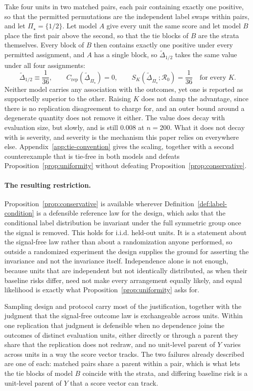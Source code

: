 \documentclass[11pt]{article}
\newcommand{\Regime}{\mathcal{R}}
\newcommand{\PSet}{\Pi_\star}
\newcommand{\Dta}{\widetilde{\Delta}}
\newcommand{\RobDta}{\underline{\widetilde{\Delta}}_{\PSet}}
\theoremstyle{remark}
\begin{document}
Take four units in two matched pairs, each pair containing exactly one positive, so that the permitted permutations are the independent label swaps within pairs, and let $\PSet=\{1/2\}$. Let model $A$ give every unit the same score and let model $B$ place the first pair above the second, so that the tie blocks of $B$ are the strata themselves. Every block of $B$ then contains exactly one positive under every permitted assignment, and $A$ has a single block, so $\Dta_{1/2}$ takes the same value under all four assignments:
\[
\Dta_{1/2}\equiv\frac{1}{36},
\qquad
C_{\mathrm{rep}}(\RobDta)=0,
\qquad
S_K(\RobDta;\Regime_0)=\frac{1}{36}
\quad\text{for every }K .
\]
Neither model carries any association with the outcomes, yet one is reported as supportedly superior to the other. Raising $K$ does not damp the advantage, since there is no replication disagreement to charge for, and an outer bound around a degenerate quantity does not remove it either. The value does decay with evaluation size, but slowly, and is still $0.008$ at $n=200$. What it does not decay with is severity, and severity is the mechanism this paper relies on everywhere else. Appendix~\ref{app:tie-convention} gives the scaling, together with a second counterexample that is tie-free in both models and defeats Proposition~\ref{prop:uniformity} without defeating Proposition~\ref{prop:conservative}.

\paragraph{The resulting restriction.}
Proposition~\ref{prop:conservative} is available wherever Definition~\ref{def:label-condition} is a defensible reference law for the design, which asks that the conditional label distribution be invariant under the full symmetric group once the signal is removed. This holds for i.i.d. held-out units. It is a statement about the signal-free law rather than about a randomization anyone performed, so outside a randomized experiment the design supplies the ground for asserting the invariance and not the invariance itself. Independence alone is not enough, because units that are independent but not identically distributed, as when their baseline risks differ, need not make every arrangement equally likely, and equal likelihood is exactly what Proposition~\ref{prop:uniformity} asks for.

Sampling design and protocol carry most of the justification, together with the judgment that the signal-free outcome law is exchangeable across units. Within one replication that judgment is defensible when no dependence joins the outcomes of distinct evaluation units, either directly or through a parent they share that the replication does not redraw, and no unit-level parent of $Y$ varies across units in a way the score vector tracks. The two failures already described are one of each: matched pairs share a parent within a pair, which is what lets the tie blocks of model $B$ coincide with the strata, and differing baseline risk is a unit-level parent of $Y$ that a score vector can track.
\end{document}
